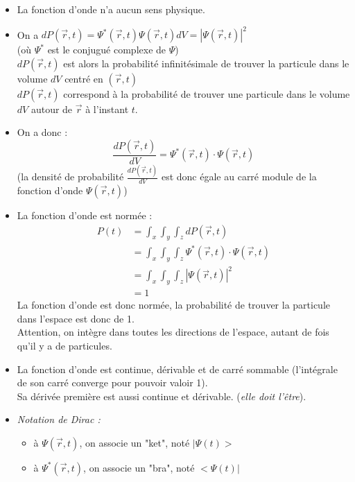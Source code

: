 \documentclass[../main.tex]{subfile}
\begin{document}
\begin{itemize}
         
   \item La fonction d'onde n'a aucun sens physique.\\

   \item On a $d P(\vec{r}, t) = \Psi^*(\vec{r}, t) \Psi(\vec{r}, t) dV = |\Psi(\vec{r}, t)|^2$\\
   (où $\Psi^*$ est le conjugué complexe de $\Psi$)\\
      $dP(\vec{r}, t)$ est alors la probabilité infinitésimale de trouver la particule dans le volume $dV$ centré en $(\vec{r}, t)$\\

   $d P(\vec{r}, t)$ correspond à la probabilité de trouver une particule dans le volume $dV$ autour de $\vec{r}$ à l'instant $t$.\\

   \item On a donc :
   $$\frac{dP(\vec{r}, t)}{dV} = \Psi^*(\vec{r}, t) \cdot \Psi(\vec{r}, t)$$
   (la densité de probabilité $\frac{dP(\vec{r}, t)}{dV}$ est donc égale au carré module de la fonction d'onde $\Psi(\vec{r}, t)$)

   \item La fonction d'onde est normée :
      $$
      \begin{aligned}
         P(t) &= \int_x \int_y \int_z dP(\vec{r}, t)\\
         &=\int_x \int_y \int_z \Psi^*(\vec{r}, t) \cdot \Psi(\vec{r}, t)\\
         &=\int_x \int_y \int_z |\Psi(\vec{r}, t)|^2\\
         &= 1
      \end{aligned}
      $$
      La fonction d'onde est donc normée, la probabilité de trouver la particule dans l'espace est donc de 1.\\
      Attention, on intègre dans toutes les directions de l'espace, autant de fois qu'il y a de particules.\\
      

   \item La fonction d'onde est continue, dérivable et de carré sommable (l'intégrale de son carré converge pour pouvoir valoir 1).\\
      Sa dérivée première est aussi continue et dérivable. (\emph{elle doit l'être}).

   \item \emph{Notation de Dirac :} 
      \begin{itemize} 
         \item à $\Psi(\vec{r}, t)$, on associe un "ket", noté $|\Psi(t)>$
         \item à $\Psi^*(\vec{r}, t)$, on associe un "bra", noté $<\Psi(t)|$
      \end{itemize}


\end{itemize}
\end{document}
